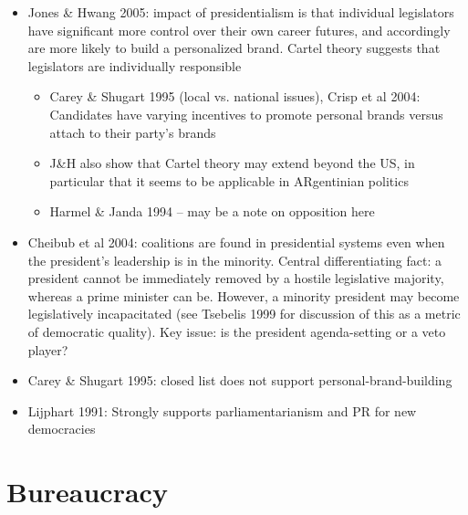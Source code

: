 \documentclass[12pt]{article}
\begin{document}
\begin{itemize}
    \item Jones \& Hwang 2005: impact of presidentialism is that individual legislators have significant more control over their own career futures, and accordingly are more likely to build a personalized brand. Cartel theory suggests that legislators are individually responsible
    \begin{itemize}
        \item Carey \& Shugart 1995 (local vs. national issues), Crisp et al 2004: Candidates have varying incentives to promote personal brands versus attach to their party's brands 
        \item J\&H also show that Cartel theory may extend beyond the US, in particular that it seems to be applicable in ARgentinian politics
        \item Harmel \& Janda 1994 -- may be a note on opposition here
    \end{itemize}
    \item Cheibub et al 2004: coalitions are found in presidential systems even when the president's leadership is in the minority. Central differentiating fact: a president cannot be immediately removed by a hostile legislative majority, whereas a prime minister can be. However, a minority president may become legislatively incapacitated (see Tsebelis 1999 for discussion of this as a metric of democratic quality). Key issue: is the president agenda-setting or a veto player?
    \item Carey \& Shugart 1995: closed list does not support personal-brand-building
    \item Lijphart 1991: Strongly supports parliamentarianism and PR for new democracies
\end{itemize}






\section*{Bureaucracy}
\end{document}
